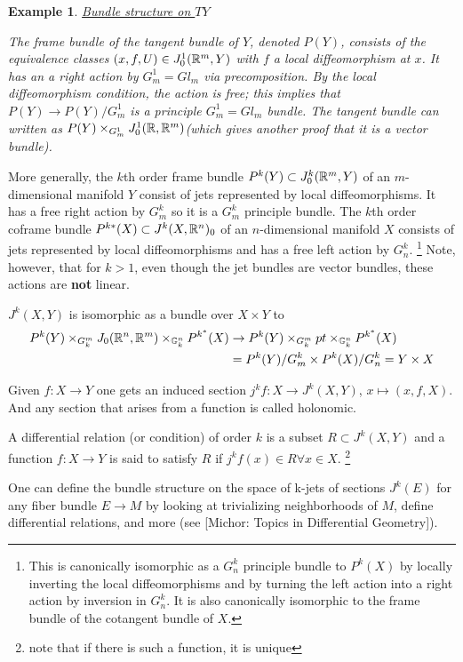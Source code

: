 \documentclass{article}
\newtheorem{example}[theorem]{Example}
\newtheorem{proposed work}[theorem]{Proposed Work}
\begin{document}
\begin{example}{\underline{Bundle structure on $TY$}}

 The frame bundle of the tangent bundle of $Y$, denoted $P(Y)$, consists of the equivalence classes $(x,f, U)  \in  J^1_0(\mathbb R^m,Y)$ with $f$ a local diffeomorphism at $x$.  It has an a right action by $G^1_m=Gl_m$ via precomposition.  By the local diffeomorphism condition, the action is free; this implies that $P(Y) \to P(Y)/G^1_m$ is a principle $G^1_m=Gl_m$ bundle.  The tangent bundle can written as $ P(Y)  \times_{G^1_m} J^1_0(\mathbb R, \mathbb R^m)$(which gives another proof that it is a vector bundle).

\end{example}

More generally, the $k$th order frame bundle $P^k(Y) \subset J_0^k(\mathbb R^m,Y)$ of an $m$-dimensional manifold $Y$ consist of jets represented by local diffeomorphisms. It has a free right action by $G^k_m$ so it is a $G^k_m$ principle bundle. The $k$th order coframe bundle $P^{k*}(X) \subset J^k(X,\mathbb R^n)_0$ of an $n$-dimensional manifold $X$ consists of jets represented by local diffeomorphisms and has a free left action by $G^k_n$. \footnote{This is canonically isomorphic as a $G^k_n$ principle bundle to $P^k(X)$ by locally inverting the local diffeomorphisms and by turning the left action into a right action by inversion in $G^k_n$.  It is also canonically isomorphic to the frame bundle of the cotangent bundle of $X$.} Note, however, that for $k>1$, even though the jet bundles are vector bundles, these actions are \textbf{not} linear.

$J^k(X,Y)$ is isomorphic as a bundle over $X \times Y$ to
\begin{align*}
P^k(Y) \times_{G^m_k} J_0(\mathbb R^n,\mathbb R^m) \times_{\mathbb G^n_k} P^{k^*}(X) &\to P^k(Y) \times_{G^m_k} pt \times_{\mathbb G^n_k} P^{k^*}(X)   \\&=  P^k(Y)/G^k_m \times P^k(X)/G^k_n=Y \times X
\end{align*}


Given $f: X \to Y$ one gets an induced section $j^kf: X \to J^k(X,Y)$, $x \mapsto (x,f, X)$. And any section that arises from a function is called holonomic.

A differential relation (or condition) of order $k$ is a subset $R \subset J^k(X,Y)$ and a function $f:X \to Y$ is said to satisfy $R$ if $j^k f(x) \in R \forall x \in X$. \footnote{note that if there is such a function, it is unique}

One can define the bundle structure on the space of k-jets of sections $J^k(E)$ for any fiber bundle $E \to M$ by looking at trivializing neighborhoods of $M$, define differential relations, and more (see [Michor: Topics in Differential Geometry]).


\printbibliography
\end{document}
